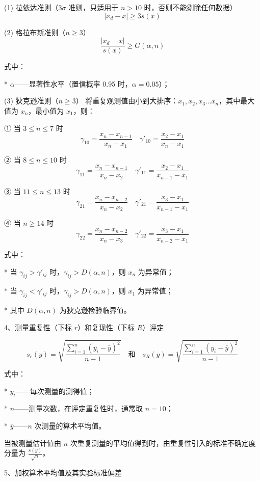\documentclass[UTF8]{ctexart}
\begin{document}
(1) 拉依达准则（\(3\sigma\) 准则，只适用于 \(n>10\) 时，否则不能剔除任何数据）
\[
|x_d - \bar{x}| \ge 3s(x)
\]

(2) 格拉布斯准则（\(n \ge 3\)）
\[
\frac{|x_d - \bar{x}|}{s(x)} \ge G(\alpha, n)
\]

式中：

*   \(\alpha\)——显著性水平（置信概率 0.95 时，\(\alpha = 0.05\)）；

(3) 狄克逊准则（\(n \ge 3\)）
将重复观测值由小到大排序：\(x_1, x_2, x_3 ... x_n\)，其中最大值为 \(x_n\)，最小值为 \(x_1\)，则：

① 当 \(3 \le n \le 7\) 时
\[
\gamma_{10} = \frac{x_n - x_{n-1}}{x_n - x_1} \quad \gamma'_{10} = \frac{x_2 - x_1}{x_n - x_1}
\]

② 当 \(8 \le n \le 10\) 时
\[
\gamma_{11} = \frac{x_n - x_{n-1}}{x_n - x_2} \quad \gamma'_{11} = \frac{x_2 - x_1}{x_{n-1} - x_1}
\]

③ 当 \(11 \le n \le 13\) 时
\[
\gamma_{21} = \frac{x_n - x_{n-2}}{x_n - x_2} \quad \gamma'_{21} = \frac{x_3 - x_1}{x_{n-1} - x_1}
\]

④ 当 \(n \ge 14\) 时
\[
\gamma_{22} = \frac{x_n - x_{n-2}}{x_n - x_3} \quad \gamma'_{22} = \frac{x_3 - x_1}{x_{n-2} - x_1}
\]

式中：

*   当 \(\gamma_{ij} > \gamma'_{ij}\) 时，\(\gamma_{ij} > D(\alpha, n)\)，则 \(x_n\) 为异常值；

*   当 \(\gamma_{ij} < \gamma'_{ij}\) 时，\(\gamma_{ij} > D(\alpha, n)\)，则 \(x_1\) 为异常值；

*   其中 \(D(\alpha, n)\) 为狄克逊检验临界值。

\vspace{5mm} 
4、测量重复性（下标 \(r\)）和复现性（下标 \(R\)）评定

\[
s_r(y) = \sqrt{\frac{\sum_{i=1}^{n} (y_i - \bar{y})^2}{n-1}} \quad \text{和} \quad s_R(y) = \sqrt{\frac{\sum_{i=1}^{n} (y_i - \bar{y})^2}{n-1}}
\]

式中：

*   \(y_i\)——每次测量的测得值；

*   \(n\)——测量次数，在评定重复性时，通常取 \(n=10\)；

*   \(\bar{y}\)——\(n\) 次测量的算术平均值。

当被测量估计值由 \(n\) 次重复测量的平均值得到时，由重复性引入的标准不确定度分量为 \(\frac{s(y)}{\sqrt{n}}\)。

\vspace{5mm} 
5、加权算术平均值及其实验标准偏差
\end{document}
